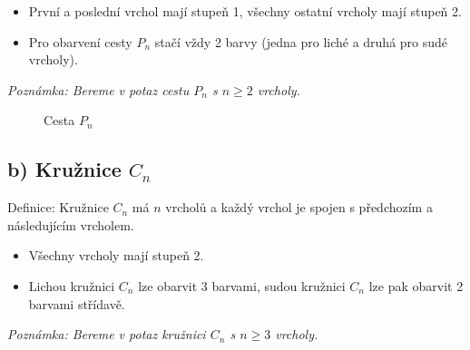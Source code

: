 \documentclass[10pt, a4paper]{ReportSheet}
\begin{document}
\begin{uloha}{1}{2}
        \begin{itemize}
            \item První a poslední vrchol mají stupeň 1, všechny ostatní vrcholy mají stupeň 2.
            \item Pro obarvení cesty $P_n$ stačí vždy 2 barvy (jedna pro liché a druhá pro sudé vrcholy).
        \end{itemize}
        \textit{Poznámka: Bereme v potaz cestu $P_n$ s $n \geq 2$ vrcholy.}

        \begin{figure}[H]
            \centering
            \caption{Cesta $P_n$}
            \label{fig:ukol-2-1a-cesta}
        \end{figure}


        \subsection{b) Kružnice $C_n$}
        \label{subsec:ukol-2-1b-kruznice}
        Definice: Kružnice $C_n$ má $n$ vrcholů a každý vrchol je spojen s předchozím a následujícím vrcholem.

        \begin{itemize}
            \item Všechny vrcholy mají stupeň 2.
            \item Lichou kružnici $C_n$ lze obarvit 3 barvami, sudou kružnici $C_n$ lze pak obarvit 2 barvami střídavě.
        \end{itemize}
        \textit{Poznámka: Bereme v potaz kružnici $C_n$ s $n \geq 3$ vrcholy.}


\end{uloha}
\end{document}
